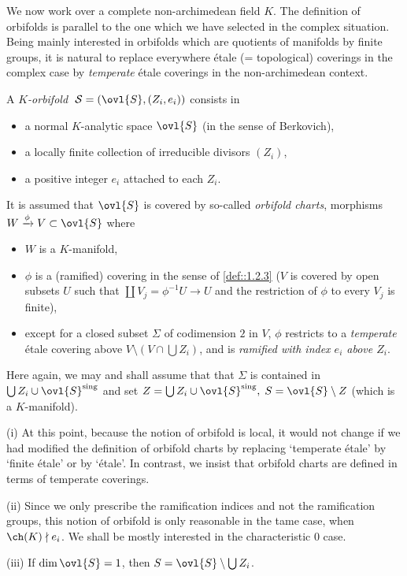 \begin{para}\label{para::4.4.1} We now work over a complete non-archimedean
 field $K$. The definition of orbifolds is parallel to the one 
 which we have selected in the complex situation. Being mainly interested
 in orbifolds which are quotients of 
 manifolds by finite groups, it is natural to replace everywhere \'etale
 (= topological) coverings in the complex case by {\it temperate}
 \'etale coverings in the non-archimedean context.

 \medskip\noindent A {\it $K$-orbifold} $\;\mathcal{S}=(\ovl{S},
 (Z_i,e_i))$ consists in 
 \begin{itemize}
  \renewcommand{\labelitemi}{\normalfont\bfseries\textendash}
  \item a normal $K$-analytic space $\ovl{S}$ (in the sense of
	Berkovich),
  \item a locally finite collection of irreducible divisors $(Z_i)$,
  \item a positive integer $e_i$ attached to each $Z_i$.
 \end{itemize}

 \noindent It is assumed that $\ovl{S}$ is covered by so-called
 {\it orbifold charts}, \ie morphisms
 $W \xrightarrow{\phi} V \subset \ovl{S} $ where 

\begin{itemize}
 \renewcommand{\labelitemi}{\normalfont\bfseries\textendash}
 \item $W$ is a $K$-manifold,
 \item $\phi$ is a (ramified) covering in the sense of \ref{def::1.2.3}
       (\ie $V$ is covered by open subsets $U$ such that 
       $\coprod V_j = \phi^{-1}U \to U$ and the restriction of $\phi$ to
       every $V_j$ is finite),
 \item except for a closed subset $\Sigma$ of codimension $2$ in $V$,
       $\phi$ restricts to a {\it temperate} \'etale covering 
       above $V\setminus (V\cap\bigcup Z_i)$, and is {\it ramified with index
       $e_i$ above $Z_i$}.
\end{itemize}  

 \medskip Here again, we may and shall assume that that $\Sigma $ is
 contained in $\bigcup Z_i\cup \ovl{S}^{\mathrm{sing}}$ and set
 $Z=\bigcup Z_i\cup \ovl{S}^{\mathrm{sing}},\;S=\ovl{S}\setminus Z$
 (which is a $K$-manifold).
\end{para}

\begin{rems}
  (i) At this point, because the notion of orbifold is local, it would
 not change if we had modified the definition of orbifold charts by
 replacing `temperate \'etale' by `finite \'etale' or by `\'etale'.  In
 contrast, we insist that orbifold charts are defined in terms of
 temperate coverings.
 
 (ii) Since we only prescribe the ramification indices and not
 the ramification groups, this notion of orbifold is 
 only reasonable in the tame case, \ie when $\ch(K) \nmid e_i$.  We 
 shall be mostly interested in the characteristic $0$ case.

 (iii) If $\dim \ovl{S} = 1$, then $S=\ovl{S}\setminus \bigcup Z_i$.
\end{rems}

